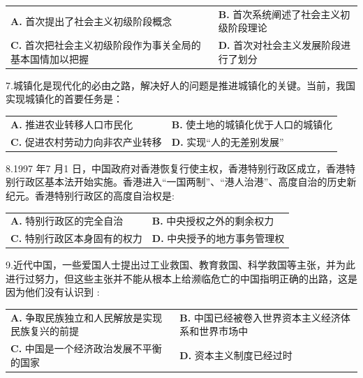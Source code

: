 \documentclass[UTF8,11pt]{ctexart}
\begin{document}
\begin{center}\begin{tabular}{>{\raggedright\arraybackslash}p{\dimexpr(\linewidth-4\tabcolsep)/2\relax}>{\raggedright\arraybackslash}p{\dimexpr(\linewidth-4\tabcolsep)/2\relax}}
\textbf{A.} 首次提出了社会主义初级阶段概念 & \textbf{B.} 首次系统阐述了社会主义初级阶段理论\\[.35em]
\textbf{C.} 首次把社会主义初级阶段作为事关全局的基本国情加以把握 & \textbf{D.} 首次对社会主义发展阶段进行了划分\\[.35em]\end{tabular}\end{center}

7.城镇化是现代化的必由之路，解决好人的问题是推进城镇化的关键。当前，我国实现城镇化的首要任务是：


\begin{center}\begin{tabular}{>{\raggedright\arraybackslash}p{\dimexpr(\linewidth-4\tabcolsep)/2\relax}>{\raggedright\arraybackslash}p{\dimexpr(\linewidth-4\tabcolsep)/2\relax}}
\textbf{A.} 推进农业转移人口市民化 & \textbf{B.} 使土地的城镇化优于人口的城镇化\\[.35em]
\textbf{C.} 促进农村劳动力向非农产业转移 & \textbf{D.} 实现“人的无差别发展”\\[.35em]\end{tabular}\end{center}

8.1997 年7 月1 日，中国政府对香港恢复行使主权，香港特别行政区成立，香港特别行政区基本法开始实施。香港进入“一国两制”、“港人治港”、高度自治的历史新纪元。香港特别行政区的高度自治权是:


\begin{center}\begin{tabular}{>{\raggedright\arraybackslash}p{\dimexpr(\linewidth-4\tabcolsep)/2\relax}>{\raggedright\arraybackslash}p{\dimexpr(\linewidth-4\tabcolsep)/2\relax}}
\textbf{A.} 特别行政区的完全自治 & \textbf{B.} 中央授权之外的剩余权力\\[.35em]
\textbf{C.} 特别行政区本身固有的权力 & \textbf{D.} 中央授予的地方事务管理权\\[.35em]\end{tabular}\end{center}

9.近代中国，一些爱国人士提出过工业救国、教育救国、科学救国等主张，并为此进行过努力，但这些主张并不能从根本上给濒临危亡的中国指明正确的出路，这是因为他们没有认识到 :


\begin{center}\begin{tabular}{>{\raggedright\arraybackslash}p{\dimexpr(\linewidth-4\tabcolsep)/2\relax}>{\raggedright\arraybackslash}p{\dimexpr(\linewidth-4\tabcolsep)/2\relax}}
\textbf{A.} 争取民族独立和人民解放是实现民族复兴的前提 & \textbf{B.} 中国已经被卷入世界资本主义经济体系和世界市场中\\[.35em]
\textbf{C.} 中国是一个经济政治发展不平衡的国家 & \textbf{D.} 资本主义制度已经过时\\[.35em]\end{tabular}\end{center}
\end{document}
